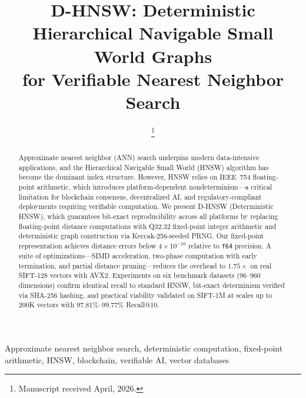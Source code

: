 \documentclass[10pt,journal]{IEEEtran}
\newcommand{\dhnsw}{\textsc{D-HNSW}}
\begin{document}
\title{D-HNSW: Deterministic Hierarchical Navigable Small World Graphs\\for Verifiable Nearest Neighbor Search}

\author{
  \thanks{Manuscript received April, 2026.}
}

\maketitle

\begin{abstract}
Approximate nearest neighbor (ANN) search underpins modern data-intensive applications, and the Hierarchical Navigable Small World (HNSW) algorithm has become the dominant index structure. However, HNSW relies on IEEE~754 floating-point arithmetic, which introduces platform-dependent nondeterminism---a critical limitation for blockchain consensus, decentralized AI, and regulatory-compliant deployments requiring verifiable computation. We present \dhnsw{} (Deterministic HNSW), which guarantees bit-exact reproducibility across all platforms by replacing floating-point distance computations with Q32.32 fixed-point integer arithmetic and deterministic graph construction via Keccak-256-seeded PRNG. Our fixed-point representation achieves distance errors below $4 \times 10^{-10}$ relative to \texttt{f64} precision. A suite of optimizations---SIMD acceleration, two-phase computation with early termination, and partial distance pruning---reduces the overhead to $1.75\times$ on real SIFT-128 vectors with AVX2. Experiments on six benchmark datasets (96--960 dimensions) confirm identical recall to standard HNSW, bit-exact determinism verified via SHA-256 hashing, and practical viability validated on SIFT-1M at scales up to 200K vectors with $97.81\%$--$99.77\%$ Recall@10.
\end{abstract}

\begin{IEEEkeywords}
Approximate nearest neighbor search, deterministic computation, fixed-point arithmetic, HNSW, blockchain, verifiable AI, vector databases
\end{IEEEkeywords}


\end{document}
